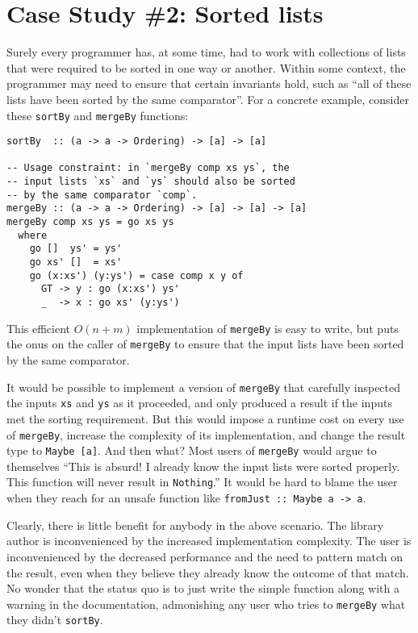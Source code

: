 \documentclass[format=sigplan, review=false, screen=true]{acmart}
\begin{document}
\section{Case Study \#2: Sorted lists}

Surely every programmer has, at some time, had to work with collections of
lists that were required to be sorted in one way or another. Within some
context, the programmer may need to ensure that certain invariants hold, such
as ``all of these lists have been sorted by the same comparator''. For a concrete
example, consider these \texttt{sortBy} and \texttt{mergeBy} functions:
\begin{verbatim}
sortBy  :: (a -> a -> Ordering) -> [a] -> [a]

-- Usage constraint: in `mergeBy comp xs ys`, the
-- input lists `xs` and `ys` should also be sorted
-- by the same comparator `comp`.
mergeBy :: (a -> a -> Ordering) -> [a] -> [a] -> [a]
mergeBy comp xs ys = go xs ys
  where
    go []  ys' = ys'
    go xs' []  = xs'
    go (x:xs') (y:ys') = case comp x y of
      GT -> y : go (x:xs') ys'
      _  -> x : go xs' (y:ys')
\end{verbatim}
This efficient $O(n+m)$ implementation of \texttt{mergeBy} is easy to write,
but puts the onus on the caller of \texttt{mergeBy} to ensure that the
input lists have been sorted by the same comparator.

It would be possible to implement a version of \texttt{mergeBy} that
carefully inspected the inputs \texttt{xs} and \texttt{ys} as it
proceeded, and only produced a result if the inputs met the sorting
requirement. But this would impose a runtime cost on every use of
\texttt{mergeBy}, increase the complexity of its implementation,
and change the result type to \texttt{Maybe [a]}. And then what?
Most users of \texttt{mergeBy} would argue to themselves ``This is
absurd! I already know the input lists were sorted properly. This
function will never result in \texttt{Nothing}.'' It would be hard
to blame the user when they reach for an  unsafe function like
\texttt{fromJust :: Maybe a -> a}.

Clearly, there is little benefit for anybody in the above scenario. The
library author is inconvenienced by the increased implementation complexity.
The user is inconvenienced by the decreased performance and the need to
pattern match on the result, even when they believe they already know the
outcome of that match. No wonder that the status quo is to just write
the simple function along with a warning in the documentation, admonishing
any user who tries to \texttt{mergeBy} what they didn't \texttt{sortBy}.
\end{document}
